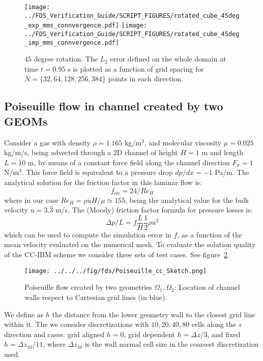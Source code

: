 \documentclass[12pt]{article}
\begin{document}
\begin{figure}[ht]
\centering
\texttt{[image: ../FDS\_Verification\_Guide/SCRIPT\_FIGURES/rotated\_cube\_45deg\_exp\_mms\_connvergence.pdf]}
\texttt{[image: ../FDS\_Verification\_Guide/SCRIPT\_FIGURES/rotated\_cube\_45deg\_imp\_mms\_connvergence.pdf]}
\caption[The {\ct Rotated Cube CC} accuracy order test case]{$45$ degree rotation. The $L_2$ error defined on the whole domain at time $t = 0.95$ s is plotted as a function of grid spacing for $N=\{32,64,128,256,384\}$ points in each direction.}\label{fig:rotcube_cc_45deg_accuracy_order}
\end{figure}




\subsection{Poiseuille flow in channel created by two GEOMs}

Consider a gas with density $\rho=1.165$ kg/m$^3$, and molecular viscosity $\mu=0.025$ kg/m/s, being advected through a 2D channel of height $H=1$ m and length $L=10$ m, by means of a constant force field along the channel direction $F_x=1$ N/m$^3$. This force field is equivalent to a pressure drop $dp/dx=-1$ Pa/m. The analytical solution for the friction factor in this laminar flow is:
%
\begin{equation}
   f_{an} = 24/Re_H
\end{equation}
%
where in our case $Re_H= \rho \overline{u} H/ \mu \simeq 155$, being the analytical value for the bulk velocity $\overline{u}=3.\hat{3}$ m/s. The (Moody) friction factor formula for pressure losses is:
%
\begin{equation}
   \Delta p / L = f \frac{L}{H}  \frac{1}{2} \rho \overline{u}^2
\end{equation}
%
which can be used to compute the simulation error in $f$, as a function of the mean velocity evaluated on the numerical mesh. To evaluate the solution quality of the CC-IBM scheme we consider three sets of test cases. See figure~\ref{Fig:PoiseSketch}.
%
\begin{figure}[h]
      \centering
      \texttt{[image: ../../../fig/fds/Poiseuille\_cc\_Sketch.png]}
      \caption{Poiseuille flow created by two geometries $\Omega_1, \Omega_2$: Location of channel walls respect to Cartesian grid lines (in blue).}
	\label{Fig:PoiseSketch}
\end{figure}
%
We define as $h$ the distance from the lower geometry wall to the closest grid line within it. The we consider discretizations with ${10,20,40,80}$ cells along the $z$ direction and cases: grid aligned $h=0$, grid dependent $h=\Delta z /3$, and fixed $h=\Delta z_{10}/11$, where $\Delta z_{10}$ is the wall normal cell size in the coarsest discretization used.
\end{document}
